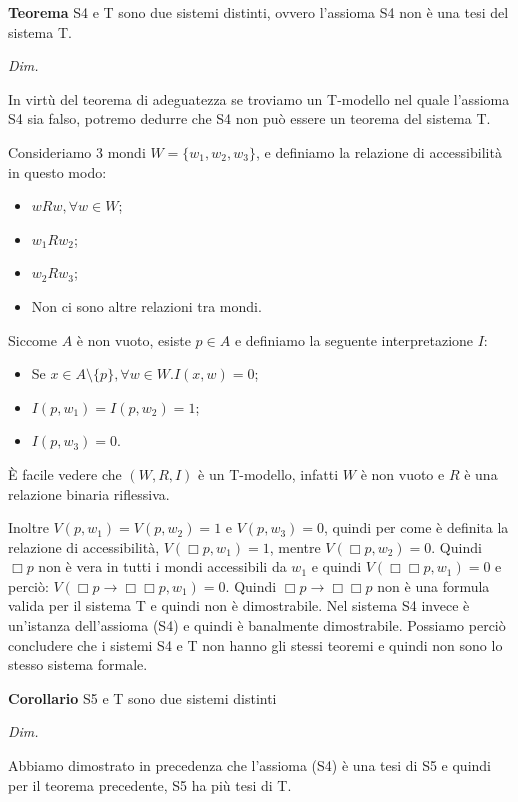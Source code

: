 \documentclass[a4paper, titlepage, 12pt]{report}
\begin{document}
\begin{flushleft}
\textbf{Teorema}
S4 e T sono due sistemi distinti, ovvero l'assioma S4 non è una tesi del sistema T.

\textit{Dim.}

In virtù del teorema di adeguatezza se troviamo un T-modello nel quale l'assioma S4
sia falso, potremo dedurre che S4 non può essere un teorema del sistema T.

Consideriamo 3 mondi $W = \{w_1, w_2, w_3\}$, e definiamo la relazione di accessibilità
in questo modo:
\begin{itemize}
    \item $wRw, \forall w \in W$;
    \item $w_1Rw_2$;
    \item $w_2Rw_3$;
    \item Non ci sono altre relazioni tra mondi.
\end{itemize}

Siccome $A$ è non vuoto, esiste $p \in A$ e definiamo la seguente interpretazione $I:$
\begin{itemize}
    \item Se $x \in A \setminus \{p\}, \forall w \in W. I(x, w) = 0$;
    \item $I(p, w_1) = I(p, w_2) = 1$;
    \item $I(p, w_3) = 0$.
\end{itemize}

È facile vedere che $(W, R, I)$ è un T-modello, infatti $W$ è non vuoto e $R$ è una relazione binaria riflessiva.

Inoltre $V(p, w_1) = V(p, w_2) = 1$ e $V(p, w_3) = 0$, quindi per come è definita
la relazione di accessibilità, $V(\Box p, w_1) = 1$, mentre
$V(\Box p, w_2) = 0$. Quindi $\Box p$ non è vera in tutti i mondi accessibili da $w_1$
e quindi $V(\Box \Box p, w_1) = 0$ e perciò: $V(\Box p \rightarrow \Box\Box p, w_1) = 0$.
Quindi $\Box p \rightarrow \Box\Box p$ non è una formula valida per il sistema T e quindi
non è dimostrabile.
Nel sistema S4 invece è un'istanza dell'assioma (S4) e quindi è banalmente dimostrabile.
Possiamo perciò concludere che i sistemi S4 e T non hanno gli stessi teoremi e quindi non
sono lo stesso sistema formale.


\end{flushleft}

\begin{flushleft}
\textbf{Corollario}
S5 e T sono due sistemi distinti

\textit{Dim.}

Abbiamo dimostrato in precedenza che l'assioma (S4) è una tesi di S5 e quindi
per il teorema precedente, S5 ha più tesi di T.
\end{flushleft}
\end{document}
